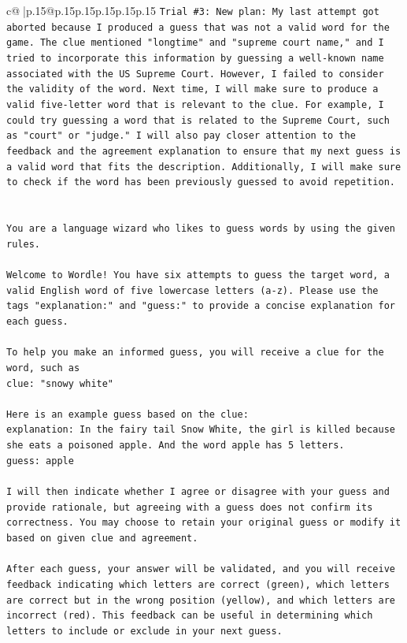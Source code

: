 \documentclass{article}
\begin{document}
{\begin{supertabular}{c@{$\;$}|p{.15\linewidth}@{}p{.15\linewidth}p{.15\linewidth}p{.15\linewidth}p{.15\linewidth}p{.15\linewidth}}
{{{\texttt{Trial \#3: New plan: My last attempt got aborted because I produced a guess that was not a valid word for the game. The clue mentioned "longtime" and "supreme court name," and I tried to incorporate this information by guessing a well{-}known name associated with the US Supreme Court. However, I failed to consider the validity of the word. Next time, I will make sure to produce a valid five{-}letter word that is relevant to the clue. For example, I could try guessing a word that is related to the Supreme Court, such as "court" or "judge." I will also pay closer attention to the feedback and the agreement explanation to ensure that my next guess is a valid word that fits the description. Additionally, I will make sure to check if the word has been previously guessed to avoid repetition.} \\
\\ 
\\ 
\texttt{You are a language wizard who likes to guess words by using the given rules.} \\
\\ 
\texttt{Welcome to Wordle! You have six attempts to guess the target word, a valid English word of five lowercase letters (a{-}z). Please use the tags "explanation:" and "guess:" to provide a concise explanation for each guess.} \\
\\ 
\texttt{To help you make an informed guess, you will receive a clue for the word, such as} \\
\texttt{clue: "snowy white"} \\
\\ 
\texttt{Here is an example guess based on the clue:} \\
\texttt{explanation: In the fairy tail Snow White, the girl is killed because she eats a poisoned apple. And the word apple has 5 letters.} \\
\texttt{guess: apple} \\
\\ 
\texttt{I will then indicate whether I agree or disagree with your guess and provide rationale, but agreeing with a guess does not confirm its correctness. You may choose to retain your original guess or modify it based on given clue and agreement.} \\
\\ 
\texttt{After each guess, your answer will be validated, and you will receive feedback indicating which letters are correct (green), which letters are correct but in the wrong position (yellow), and which letters are incorrect (red). This feedback can be useful in determining which letters to include or exclude in your next guess.} \\
}}}
\end{supertabular}}
\end{document}

